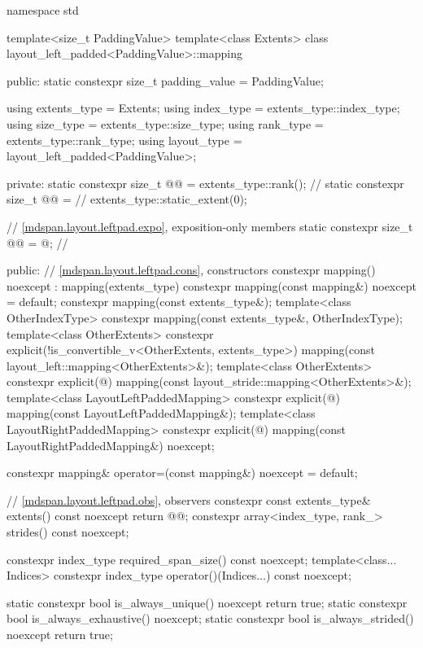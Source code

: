 \begin{codeblock}
namespace std {
  template<size_t PaddingValue>
  template<class Extents>
  class layout_left_padded<PaddingValue>::mapping {
  public:
    static constexpr size_t padding_value = PaddingValue;

    using extents_type = Extents;
    using index_type = extents_type::index_type;
    using size_type = extents_type::size_type;
    using rank_type = extents_type::rank_type;
    using layout_type = layout_left_padded<PaddingValue>;

  private:
    static constexpr size_t @@ = extents_type::rank();         // \expos
    static constexpr size_t @@ =                 // \expos
      extents_type::static_extent(0);

    // \ref{mdspan.layout.leftpad.expo}, exposition-only members
    static constexpr size_t @@ = @\seebelow@;  // \expos

  public:
    // \ref{mdspan.layout.leftpad.cons}, constructors
    constexpr mapping() noexcept : mapping(extents_type{}) {}
    constexpr mapping(const mapping&) noexcept = default;
    constexpr mapping(const extents_type&);
    template<class OtherIndexType>
      constexpr mapping(const extents_type&, OtherIndexType);
    template<class OtherExtents>
      constexpr explicit(!is_convertible_v<OtherExtents, extents_type>)
        mapping(const layout_left::mapping<OtherExtents>&);
    template<class OtherExtents>
      constexpr explicit(@\seebelow@)
        mapping(const layout_stride::mapping<OtherExtents>&);
    template<class LayoutLeftPaddedMapping>
      constexpr explicit(@\seebelow@)
        mapping(const LayoutLeftPaddedMapping&);
    template<class LayoutRightPaddedMapping>
      constexpr explicit(@\seebelow@)
        mapping(const LayoutRightPaddedMapping&) noexcept;

    constexpr mapping& operator=(const mapping&) noexcept = default;

    // \ref{mdspan.layout.leftpad.obs}, observers
    constexpr const extents_type& extents() const noexcept { return @@; }
    constexpr array<index_type, rank_> strides() const noexcept;

    constexpr index_type required_span_size() const noexcept;
    template<class... Indices>
      constexpr index_type operator()(Indices...) const noexcept;

    static constexpr bool is_always_unique() noexcept { return true; }
    static constexpr bool is_always_exhaustive() noexcept;
    static constexpr bool is_always_strided() noexcept { return true; }

}}
\end{codeblock}
